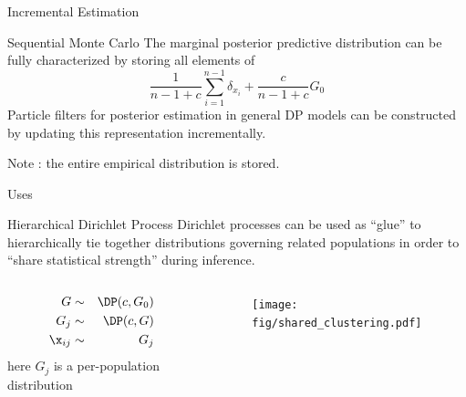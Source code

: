 \documentclass{beamer}
\begin{document}
\begin{frame}[t]{Incremental Estimation}
\begin{block}{Sequential Monte Carlo}
The marginal posterior predictive distribution can be fully characterized by storing all elements of 
\[\frac{1}{n-1+c}\sum_{i=1}^{n-1}\delta_{x_i} + \frac{c}{n-1+c}G_0\]
Particle filters for posterior estimation in general DP models can be constructed by
 updating this representation incrementally.
\bigskip

Note : the entire empirical distribution is stored.
\end{block}
\end{frame}


\begin{frame}[t]{Uses}
\begin{block}{Hierarchical Dirichlet Process \cite{Teh2006b}}
Dirichlet processes can be used as ``glue'' to hierarchically tie together distributions governing related populations in order to ``share statistical strength'' during inference.
\begin{columns}[t]
\begin{column}{.5\textwidth}
\begin{eqnarray*}
G &\sim& \DP(c,G_0) \\
G_j &\sim& \DP(c,G) \\
\x_{ij} &\sim& G_j \\
\end{eqnarray*} 
\centering
\hspace{.25cm} here $G_j$ is a per-population distribution
\end{column}
\begin{column}{.5\textwidth}
\begin{figure}
\begin{center}
\texttt{[image: fig/shared\_clustering.pdf]}
\label{default}
\end{center}
\end{figure}
\end{column}
\end{columns}
\end{block}
\end{frame}	
\end{document}
